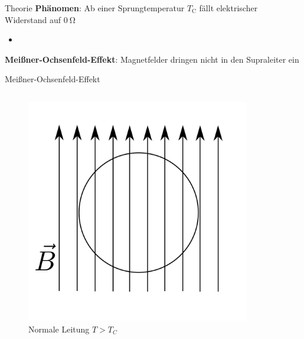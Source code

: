 \begin{frame}{Theorie}
\textbf{Phänomen}: Ab einer Sprungtemperatur $T_{\mathup{C}}$ fällt elektrischer Widerstand auf $\SI{0}{\ohm}$ \\
\begin{itemize}
  \item
\end{itemize}


\textbf{Meißner-Ochsenfeld-Effekt}: Magnetfelder dringen nicht in den Supraleiter ein

\end{frame}



\begin{frame}{Meißner-Ochsenfeld-Effekt}
\begin{columns}
\begin{column}{0.49\textwidth}
  \begin{figure}
    \includegraphics[width = \textwidth]{supra_1.pdf}
    \caption{Normale Leitung $T > T_{C}$}
    \label{}
  \end{figure}
\end{column}
\begin{column}{0.49\textwidth}
  \begin{figure}

\end{figure}
\end{column}
\end{columns}
\end{frame}
